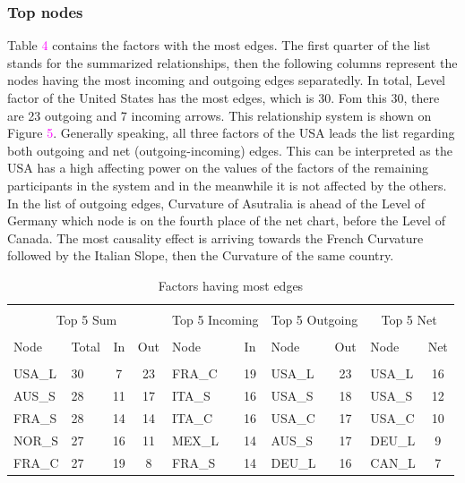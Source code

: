 \documentclass[12pt,bibliography=totoc]{article}
\begin{document}
\subsubsection{Top nodes}

Table \textcolor{magenta}{4} contains the factors with the most edges. The first quarter of the list stands for the summarized relationships, then the following columns represent the nodes having the most incoming and outgoing edges separatedly. In total, Level factor of the United States has the most edges, which is 30. Fom this 30, there are 23 outgoing and 7 incoming arrows. This relationship system is shown on Figure \textcolor{magenta}{5}. Generally speaking, all three factors of the USA leads the list regarding both outgoing and net (outgoing-incoming) edges. This can be interpreted as the USA has a high affecting power on the values of the factors of the remaining participants in the system and in the meanwhile it is not affected by the others. In the list of outgoing edges, Curvature of Asutralia is ahead of the Level of Germany which node is on the fourth place of the net chart, before the Level of Canada. The most causality effect is arriving towards the French Curvature followed by the Italian Slope, then the Curvature of the same country.

\begin{table}[h]

\fontsize{10}{10}\selectfont
\setlength{\tabcolsep}{10pt}
\centering%
\begin{tabular}{l  lcc  lc lc  lc}%

\hline\hline \\ [-1.5ex]                         %


\multicolumn{4}{c}{Top 5 Sum}					&	\multicolumn{2}{c}{Top 5 Incoming}			&	\multicolumn{2}{c}{Top 5 Outgoing}			&	\multicolumn{2}{c}{Top 5 Net}	\\	
\hline \\ [-1.5ex]    
Node	&	Total 	&	In	&	Out	&	Node	&	In	&	Node	&	Out	&	Node	&	Net	\\
\hline \\ [-1.5ex]    
USA\_L&	30	&	7	&	23	&	FRA\_C	&	19	&	USA\_L	&	23	&	USA\_L	&	16	\\
AUS\_S	&	28	&	11	&	17	&	ITA\_S	&	16	&	USA\_S	&	18	&	USA\_S	&	12	\\
FRA\_S	&	28	&	14	&	14	&	ITA\_C	&	16	&	USA\_C	&	17	&	USA\_C	&	10	\\
NOR\_S	&	27	&	16	&	11	&	MEX\_L	&	14	&	AUS\_S	&	17	&	DEU\_L	&	9	\\
FRA\_C	&	27	&	19	&	8	&	FRA\_S	&	14	&	DEU\_L	&	16	&	CAN\_L	&	7	\\

\hline            
\end{tabular}
\label{table:nonlin}%

\caption{Factors having most edges} %

\end{table}
\end{document}
